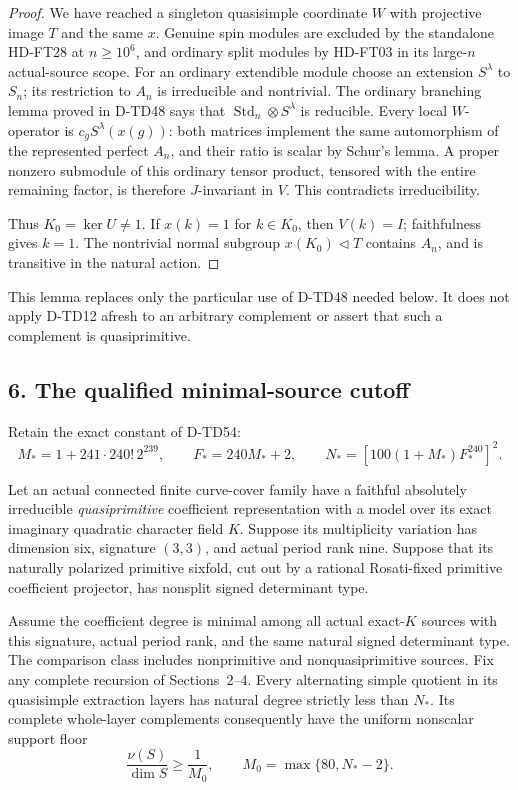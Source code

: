 \begin{proof}
We have reached a singleton quasisimple coordinate \(W\)
with projective image \(T\) and the same \(x\).
Genuine spin modules are excluded by the standalone
HD-FT28 at \(n\ge10^6\), and ordinary split modules by
HD-FT03 in its large-\(n\) actual-source scope.
For an ordinary extendible module choose an extension
\(S^\lambda\) to \(S_n\); its restriction to \(A_n\)
is irreducible and nontrivial. The ordinary branching
lemma proved in D-TD48 says that
\(\operatorname{Std}_n\otimes S^\lambda\) is reducible.
Every local \(W\)-operator is \(c_g S^\lambda(x(g))\):
both matrices implement the same automorphism of the
represented perfect \(A_n\), and their ratio is scalar
by Schur's lemma. A proper nonzero submodule of this
ordinary tensor product, tensored with the entire
remaining factor, is therefore \(J\)-invariant in \(V\).
This contradicts irreducibility.

Thus \(K_0=\ker U\ne1\). If \(x(k)=1\) for \(k\in K_0\),
then \(V(k)=I\); faithfulness gives \(k=1\).
The nontrivial normal subgroup \(x(K_0)\triangleleft T\)
contains \(A_n\), and is transitive in the natural action.
\end{proof}

This lemma replaces only the particular use of D-TD48
needed below. It does not apply D-TD12 afresh to an
arbitrary complement or assert that such a complement
is quasiprimitive.

\subsection*{6. The qualified minimal-source cutoff}

Retain the exact constant of D-TD54:
\[
 M_*=1+241\cdot240!\,2^{239},\qquad F_*=240M_*+2,\qquad
 N_*=[100(1+M_*)F_*^{240}]^2.
 \tag{QPX.11}
\]

\begin{theorem}[D-TD62]
Let an actual connected finite curve-cover family have a
faithful absolutely irreducible \emph{quasiprimitive}
coefficient representation with a model over its exact
imaginary quadratic character field \(K\). Suppose its
multiplicity variation has dimension six, signature \((3,3)\),
and actual period rank nine. Suppose that its naturally
polarized primitive sixfold, cut out by a rational
Rosati-fixed primitive coefficient projector, has nonsplit
signed determinant type.

Assume the coefficient degree is minimal among all actual
exact-\(K\) sources with this signature, actual period rank,
and the same natural signed determinant type. The comparison
class includes nonprimitive and nonquasiprimitive sources.
Fix any complete recursion of Sections~2--4.
Every alternating simple quotient in its quasisimple
extraction layers has natural degree strictly less than \(N_*\).
Its complete whole-layer complements consequently have
the uniform nonscalar support floor
\[
        \frac{\nu(S)}{\dim S}\ge\frac1{M_0},
        \qquad M_0=\max\{80,N_*-2\}.
 \tag{QPX.12}
\]
\end{theorem}

